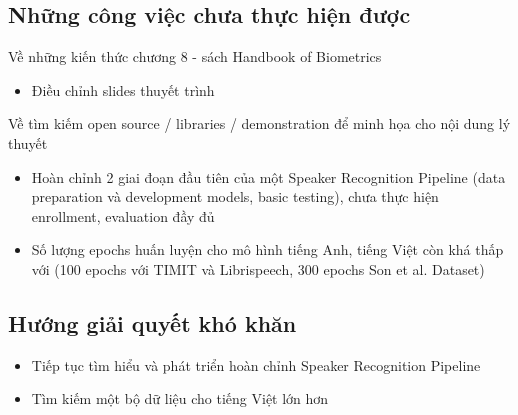 \documentclass{article}
\begin{document}
	\subsection{Những công việc chưa thực hiện được}
	Về những kiến thức chương 8 - sách Handbook of Biometrics
	\begin{itemize}
		\item Điều chỉnh slides thuyết trình
	\end{itemize}
	Về tìm kiếm open source / libraries / demonstration để minh họa cho nội dung lý thuyết
	\begin{itemize}
		\item Hoàn chỉnh 2 giai đoạn đầu tiên của một Speaker Recognition Pipeline (data preparation và development models, basic testing), chưa thực hiện enrollment, evaluation đầy đủ
		\item Số lượng epochs huấn luyện cho mô hình tiếng Anh, tiếng Việt còn khá thấp với (100 epochs với TIMIT và Librispeech, 300 epochs Son et al. Dataset)
	\end{itemize}
	\subsection{Hướng giải quyết khó khăn}
	\begin{itemize}
		\item Tiếp tục tìm hiểu và phát triển hoàn chỉnh Speaker Recognition Pipeline 
		\item Tìm kiếm một bộ dữ liệu cho tiếng Việt lớn hơn
	\end{itemize}
\end{document}
